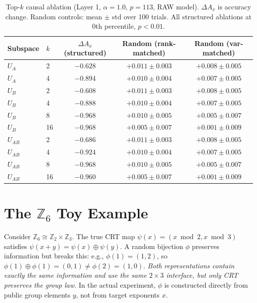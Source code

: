 \documentclass[11pt,a4paper]{article}
\theoremstyle{definition}
\theoremstyle{remark}
\newcommand{\Z}{\mathbb{Z}}
\begin{document}
\begin{table}[h]
\centering
\caption{Top-$k$ causal ablation (Layer 1, $\alpha = 1.0$, $p=113$, RAW model). $\Delta A_x$ is accuracy change. Random controls: mean $\pm$ std over 100 trials. All structured ablations at 0th percentile, $p < 0.01$.}
\label{tab:topk_ablation}
\begin{tabular}{llccc}
\toprule
Subspace & $k$ & $\Delta A_x$ (structured) & Random (rank-matched) & Random (var-matched) \\
\midrule
$U_A$ & 2 & $-0.628$ & $+0.011 \pm 0.003$ & $+0.008 \pm 0.005$ \\
$U_A$ & 4 & $-0.894$ & $+0.010 \pm 0.004$ & $+0.007 \pm 0.005$ \\
$U_B$ & 2 & $-0.608$ & $+0.011 \pm 0.003$ & $+0.008 \pm 0.005$ \\
$U_B$ & 4 & $-0.888$ & $+0.010 \pm 0.004$ & $+0.007 \pm 0.005$ \\
$U_B$ & 8 & $-0.968$ & $+0.010 \pm 0.005$ & $+0.005 \pm 0.007$ \\
$U_B$ & 16 & $-0.968$ & $+0.005 \pm 0.007$ & $+0.001 \pm 0.009$ \\
$U_{AB}$ & 2 & $-0.686$ & $+0.011 \pm 0.003$ & $+0.008 \pm 0.005$ \\
$U_{AB}$ & 4 & $-0.924$ & $+0.010 \pm 0.004$ & $+0.007 \pm 0.005$ \\
$U_{AB}$ & 8 & $-0.968$ & $+0.010 \pm 0.005$ & $+0.005 \pm 0.007$ \\
$U_{AB}$ & 16 & $-0.960$ & $+0.005 \pm 0.007$ & $+0.001 \pm 0.009$ \\
\bottomrule
\end{tabular}
\end{table}

\section{The $\Z_6$ Toy Example}

Consider $\Z_6 \cong \Z_2 \times \Z_3$. The true CRT map $\psi(x) = (x \bmod 2, x \bmod 3)$ satisfies $\psi(x+y) = \psi(x) \oplus \psi(y)$. A random bijection $\phi$ preserves information but breaks this: e.g., $\phi(1) = (1,2)$, so $\phi(1) \oplus \phi(1) = (0,1) \neq \phi(2) = (1,0)$. \emph{Both representations contain exactly the same information and use the same $2 \times 3$ interface, but only CRT preserves the group law.} In the actual experiment, $\phi$ is constructed directly from public group elements $y$, not from target exponents $x$.
\end{document}
